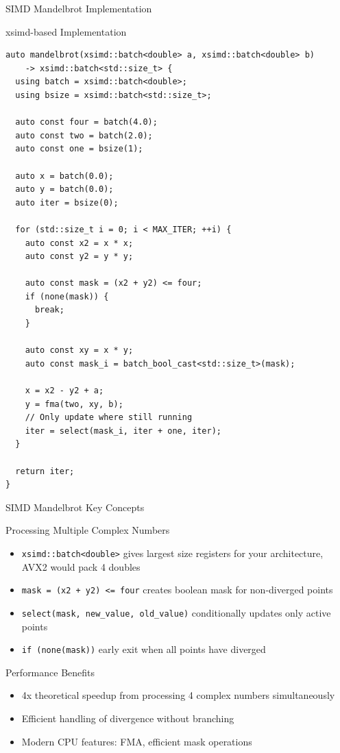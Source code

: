 \documentclass{beamer}
\begin{document}
\begin{frame}[fragile]{SIMD Mandelbrot Implementation}
    \begin{exampleblock}{xsimd-based Implementation}
        \begin{verbatim}
auto mandelbrot(xsimd::batch<double> a, xsimd::batch<double> b)
    -> xsimd::batch<std::size_t> {
  using batch = xsimd::batch<double>;
  using bsize = xsimd::batch<std::size_t>;

  auto const four = batch(4.0);
  auto const two = batch(2.0);
  auto const one = bsize(1);

  auto x = batch(0.0);
  auto y = batch(0.0);
  auto iter = bsize(0);

  for (std::size_t i = 0; i < MAX_ITER; ++i) {
    auto const x2 = x * x;
    auto const y2 = y * y;

    auto const mask = (x2 + y2) <= four;
    if (none(mask)) {
      break;
    }

    auto const xy = x * y;
    auto const mask_i = batch_bool_cast<std::size_t>(mask);

    x = x2 - y2 + a;
    y = fma(two, xy, b);
    // Only update where still running
    iter = select(mask_i, iter + one, iter);
  }

  return iter;
}
        \end{verbatim}
    \end{exampleblock}
\end{frame}

\begin{frame}{SIMD Mandelbrot Key Concepts}
    \begin{block}{Processing Multiple Complex Numbers}
        \begin{itemize}
            \item \texttt{xsimd::batch<double>} gives largest size registers for your architecture, AVX2 would pack 4 doubles
            \item \texttt{mask = (x2 + y2) <= four} creates boolean mask for non-diverged points
            \item \texttt{select(mask, new\_value, old\_value)} conditionally updates only active points
            \item \texttt{if (none(mask))} early exit when all points have diverged
        \end{itemize}
    \end{block}
    
    \begin{block}{Performance Benefits}
        \begin{itemize}
            \item 4x theoretical speedup from processing 4 complex numbers simultaneously
            \item Efficient handling of divergence without branching
            \item Modern CPU features: FMA, efficient mask operations
        \end{itemize}
    \end{block}
\end{frame}
\end{document}
